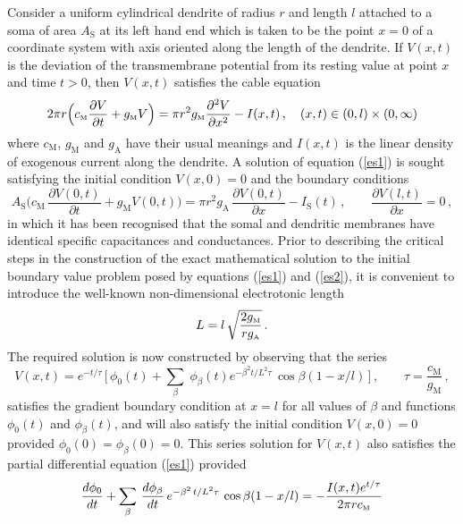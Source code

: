Consider a uniform cylindrical dendrite of radius $r$ and length
$l$ attached to a soma of area $A_\mathrm{S}$ at its left hand end
which is taken to be the point $x=0$ of a coordinate system with
axis oriented along the length of the dendrite. If $V(x,t)$ is the
deviation of the transmembrane potential from its resting value at
point $x$ and time $t>0$, then $V(x,t)$ satisfies the cable equation
\begin{equation}\label{es1}
\displaystyle2\pi r\Big(c_{\mbox{\tiny M}}\frac{\partial V}{\partial t}
+g_{\mbox{\tiny M}}V\Big)=\pi r^2 g_{\mbox{\tiny M}}\frac{\partial^2V}
{\partial x^2}-I(x,t)\,,\quad (x,t)\in(0,l)\times(0,\infty)
\end{equation}
where $c_\mathrm{M}$, $g_\mathrm{M}$ and $g_\mathrm{A}$ have their
usual meanings and $I(x,t)$ is the linear density of exogenous
current along the dendrite. A solution of equation (\ref{es1}) is
sought satisfying the initial condition $V(x,0)=0$ and the
boundary conditions
\begin{equation}\label{es2}
A_\mathrm{S}\Big(c_\mathrm{M}\,\frac{\partial V(0,t)}{\partial t}
+g_\mathrm{M}V(0,t)\Big)=\pi r^2g_\mathrm{A}\,
\frac{\partial V(0,t)}{\partial x}-I_\mathrm{S}(t)\,,
\qquad\frac{\partial V(l,t)}{\partial x}=0\,,
\end{equation}
in which it has been recognised that the somal and dendritic
membranes have identical specific capacitances and conductances.
Prior to describing the critical steps in the construction of the
exact mathematical solution to the initial boundary value problem
posed by equations (\ref{es1}) and (\ref{es2}), it is convenient
to introduce the well-known non-dimensional electrotonic length
\begin{equation}\label{es3}
L=l\,\sqrt{\displaystyle\frac{2 g_{\mbox{\tiny M}}}{r g_{\mbox{\tiny A}}}}\,.
\end{equation}
The required solution is now constructed by observing that the
series
\begin{equation}\label{es4}
V(x,t)=e^{-t/\tau}\,\Big[\,\phi_0(t)+\sum_\beta\;\phi_\beta(t)
e^{-\beta^2 t/L^2\tau}\,\cos{\beta(1-x/l)}\,\Big]\,,
\qquad\tau=\frac{c_\mathrm{M}}{g_\mathrm{M}}\,,
\end{equation}
satisfies the gradient boundary condition at $x=l$ for all values
of $\beta$ and functions $\phi_0(t)$ and $\phi_\beta(t)$, and will
also satisfy the initial condition $V(x,0)=0$ provided
$\phi_0(0)=\phi_\beta(0)=0$. This series solution for $V(x,t)$
also satisfies the partial differential equation (\ref{es1})
provided
\begin{equation}\label{es4}
\displaystyle\frac{d\phi_0}{dt}+\sum_\beta\,\frac{d\phi_\beta}{dt}
\,e^{-\beta^2\,t/L^2\tau}\,\cos{\beta(1-x/l)}
=-\frac{I(x,t)e^{t/\tau}}{2\pi r c_{\mbox{\tiny M}}}
\end{equation}
